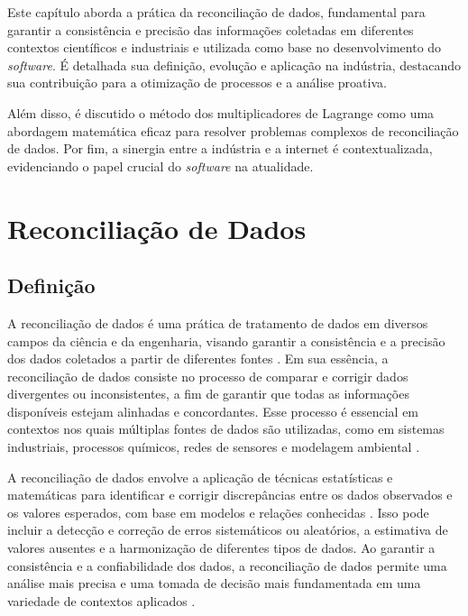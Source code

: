 \label{Cap:ReferencialTeorico}

Este capítulo aborda a prática da reconciliação de dados, fundamental para garantir a consistência e precisão das informações coletadas em diferentes contextos científicos e industriais e utilizada como base no desenvolvimento do \textit{software}. É detalhada sua definição, evolução e aplicação na indústria, destacando sua contribuição para a otimização de processos e a análise proativa. 
    
Além disso, é discutido o método dos multiplicadores de Lagrange como uma abordagem matemática eficaz para resolver problemas complexos de reconciliação de dados. Por fim, a sinergia entre a indústria e a internet é contextualizada, evidenciando o papel crucial do \textit{software} na atualidade.

\section{Reconciliação de Dados}
\subsection{Definição}

A reconciliação de dados é uma prática de tratamento de dados em diversos campos da ciência e da engenharia, visando garantir a consistência e a precisão dos dados coletados a partir de diferentes fontes \cite{datarecshakar}. Em sua essência, a reconciliação de dados consiste no processo de comparar e corrigir dados divergentes ou inconsistentes, a fim de garantir que todas as informações disponíveis estejam alinhadas e concordantes. Esse processo é essencial em contextos nos quais múltiplas fontes de dados são utilizadas, como em sistemas industriais, processos químicos, redes de sensores e modelagem ambiental \cite{datarecshakar}.
        
A reconciliação de dados envolve a aplicação de técnicas estatísticas e matemáticas para identificar e corrigir discrepâncias entre os dados observados e os valores esperados, com base em modelos e relações conhecidas \cite{datarecragnoli}. Isso pode incluir a detecção e correção de erros sistemáticos ou aleatórios, a estimativa de valores ausentes e a harmonização de diferentes tipos de dados. Ao garantir a consistência e a confiabilidade dos dados, a reconciliação de dados permite uma análise mais precisa e uma tomada de decisão mais fundamentada em uma variedade de contextos aplicados \cite{datarecragnoli}.
    
